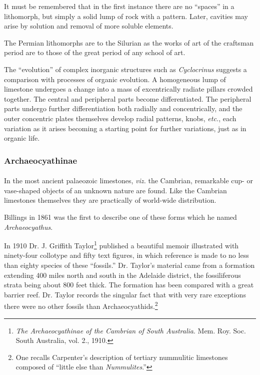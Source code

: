 \documentclass[a4paper, 12pt, oneside]{article}
\begin{document}
It must be remembered that in the first instance there are no ``spaces'' in a lithomorph, but simply a solid lump of rock with a pattern. Later, cavities may arise by solution and removal of more soluble elements.

The Permian lithomorphs are to the Silurian as the works of art of the craftsman period are to those of the great period of any school of art.

The ``evolution'' of complex inorganic structures such as \emph{Cyclocrinus} suggests a comparison with processes of organic evolution. A homogeneous lump of limestone undergoes a change into a mass of excentrically radiate pillars crowded together. The central and peripheral parts become differentiated. The peripheral parts undergo further differentiation both radially and concentrically, and the outer concentric plates themselves develop radial patterns, knobs, \emph{etc.}, each variation as it arises becoming a starting point for further variations, just as in organic life.

\subsubsection{Archaeocyathinae}
\paragraph{}
In the most ancient palaeozoic limestones, \emph{viz.} the Cambrian, remarkable cup- or vase-shaped objects of an unknown nature are found. Like the Cambrian limestones themselves they are practically of world-wide distribution.

Billings in 1861 was the first to describe one of these forms which he named \emph{Archaeocyathus}.

In 1910 Dr. J. Griffith Taylor\footnote{\emph{The Archaeocyathinae of the Cambrian of South Australia}. Mem. Roy. Soc. South Australia, vol. 2., 1910.} published a beautiful memoir illustrated with ninety-four collotype and fifty text figures, in which reference is made to no less than eighty species of these ``fossils.'' Dr. Taylor's material came from a formation extending 400 miles north and south in the Adelaide district, the fossiliferous strata being about 800 feet thick. The formation has been compared with a great barrier reef. Dr. Taylor records the singular fact that with very rare exceptions there were no other fossils than Archaeocyathids.\footnote{One recalls Carpenter's description of tertiary nummulitic limestones composed of ``little else than \emph{Nummulites}.''}
\end{document}
